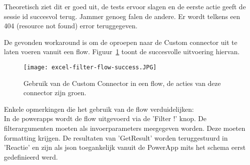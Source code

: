 Theoretisch ziet dit er goed uit, de tests ervoor slagen en de eerste actie geeft de sessie id succesvol terug. Jammer genoeg falen de andere. Er wordt telkens een 404 (resource not found) error teruggegeven.

De gevonden workaround is om de oproepen naar de Custom connector uit te laten voeren vanuit een flow. Figuur~\ref{fig:excel-filter-flow-success} toont de succesvolle uitvoering hiervan.

\begin{figure}[h!]
    \centering
    \texttt{[image: excel-filter-flow-success.JPG]}
    \caption{Gebruik van de Custom Connector in een flow, de acties van deze connector zijn groen.}
    \label{fig:excel-filter-flow-success}
\end{figure}

Enkele opmerkingen die het gebruik van de flow verduidelijken:\\
In de powerapps wordt de flow uitgevoerd via de 'Filter !' knop.
De filterargumenten moeten als invoerparameters meegegeven worden. Deze moeten formatting krijgen.
De resultaten van 'GetResult' worden teruggestuurd in 'Reactie' en zijn als json toegankelijk vanuit de PowerApp mits het schema eerst gedefinieerd werd.
